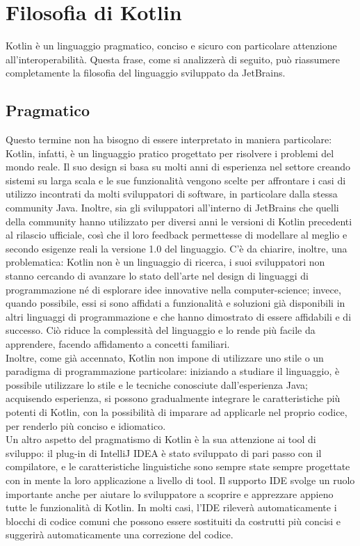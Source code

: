 \section{Filosofia di Kotlin}
Kotlin è un linguaggio pragmatico, conciso e sicuro con particolare attenzione all'interoperabilità. Questa frase, come si analizzerà di seguito, può riassumere completamente la filosofia del linguaggio sviluppato da JetBrains.\\

\subsection{Pragmatico}
Questo termine non ha bisogno di essere interpretato in maniera particolare: Kotlin, infatti, è un linguaggio pratico progettato per risolvere i problemi del mondo reale. Il suo design si basa su molti anni di esperienza nel settore creando sistemi su larga scala e le sue funzionalità vengono scelte per affrontare i casi di utilizzo incontrati da molti sviluppatori di software, in particolare dalla stessa community Java. Inoltre, sia gli sviluppatori all'interno di JetBrains che quelli della community hanno utilizzato per diversi anni le versioni di Kotlin precedenti al rilascio ufficiale, così che il loro feedback permettesse di modellare al meglio e secondo esigenze reali la versione 1.0 del linguaggio. C’è da chiarire, inoltre, una problematica: Kotlin non è un linguaggio di ricerca, i suoi sviluppatori non stanno cercando di avanzare lo stato dell'arte nel design di linguaggi di programmazione né di esplorare idee innovative nella computer-science; invece, quando possibile, essi si sono affidati a funzionalità e soluzioni già disponibili in altri linguaggi di programmazione e che hanno dimostrato di essere affidabili e di successo. Ciò riduce la complessità del linguaggio e lo rende più facile da apprendere, facendo affidamento a concetti familiari.\\
Inoltre, come già accennato, Kotlin non impone di utilizzare uno stile o un paradigma di programmazione particolare: iniziando a studiare il linguaggio, è possibile utilizzare lo stile e le tecniche conosciute dall'esperienza Java; acquisendo esperienza, si possono gradualmente integrare le caratteristiche più potenti di Kotlin, con la possibilità di imparare ad applicarle nel proprio codice, per renderlo più conciso e idiomatico.\\
Un altro aspetto del pragmatismo di Kotlin è la sua attenzione ai tool di sviluppo: il plug-in di IntelliJ IDEA è stato sviluppato di pari passo con il compilatore, e le caratteristiche linguistiche sono sempre state sempre progettate con in mente la loro applicazione a livello di tool. Il supporto IDE svolge un ruolo importante anche per aiutare lo sviluppatore a scoprire e apprezzare appieno tutte le funzionalità di Kotlin. In molti casi, l’IDE rileverà automaticamente i blocchi di codice comuni che possono essere sostituiti da costrutti più concisi e suggerirà automaticamente una correzione del codice.\\

